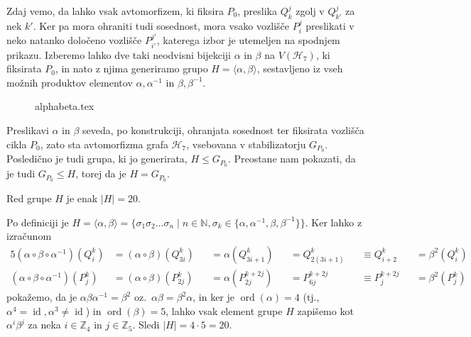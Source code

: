 \documentclass[fin1, tisk]{fmfdelo}
\newcommand{\hof}{\mathscr{H}_{7}}
\newcommand{\ord}{\operatorname{ord}}
\newcommand{\id}{\operatorname{id}}
\begin{document}
Zdaj vemo, da lahko vsak avtomorfizem, ki fiksira $P_0$, preslika $Q_k^j$ zgolj v $Q_{k'}^{j}$ za nek $k'$.
Ker pa mora ohraniti tudi sosednost, mora vsako vozlišče $P_i^j$ preslikati v neko natanko določeno vozlišče $P_{i'}^{j'}$, 
katerega izbor je utemeljen na spodnjem prikazu.
Izberemo lahko dve taki neodvisni bijekciji $\alpha$ in $\beta$ na $V(\hof)$, 
ki fiksirata $P_0$, in nato z njima generiramo grupo
$H = \langle\alpha,\beta\rangle$, sestavljeno iz vseh možnih produktov elementov $\alpha, \alpha^{-1}$ in $\beta, \beta^{-1}$.
 
\begin{figure}[h]
    {alphabeta.tex}
\end{figure}

\begin{opomba}
    Preslikavi $\alpha$ in $\beta$ seveda, po konstrukciji, ohranjata sosednost ter fiksirata vozlišča cikla $P_0$,
    zato sta avtomorfizma grafa $\hof$, vsebovana v stabilizatorju $G_{P_0}$.
    Posledično je tudi grupa, ki jo generirata, $H \leq G_{P_0}$. Preostane nam pokazati,
    da je tudi $G_{P_0} \leq H$, torej da je $H = G_{P_0}$.
\end{opomba}

\begin{lema}\label{le:red_grupe_pi}
    Red grupe $H$ je enak $|H| = 20$.
\end{lema}
\begin{dokaz}
    Po definiciji je 
    $H = \langle \alpha, \beta \rangle= \{\sigma_1\sigma_2\ldots \sigma_n\mid n\in\mathbb{N}, \sigma_k\in \{\alpha, \alpha^{-1}, \beta, \beta^{-1}\}\}$.
    Ker lahko z izračunom 
    \begin{alignat*}{5}
    (\alpha\circ\beta\circ\alpha^{-1})(Q_i^k) &= 
    (\alpha\circ\beta)(Q_{3i}^k) &&= 
    \alpha(Q_{3i+1}^k) &&= Q_{2(3i+1)}^{k}
    &&\equiv Q_{i+2}^k &&= \beta^2(Q_i^k)\\
    (\alpha\circ\beta\circ\alpha^{-1})(P_j^k) &=
    (\alpha\circ\beta)(P_{2j}^k) &&= 
    \alpha(P_{2j}^{k+2j}) &&= P_{6j}^{k+2j}
    &&\equiv P_j^{k+2j} &&= \beta^2(P_j^k)
    \end{alignat*}
    pokažemo, da je $\alpha\beta\alpha^{-1} = \beta^2$ oz.~$\alpha\beta = \beta^2\alpha$, 
    in ker je $\ord(\alpha) = 4$ (tj., $\alpha^4 = \id, \alpha^3 \neq \id$) in $\ord(\beta) = 5$,
    lahko vsak element grupe $H$ zapišemo kot $\alpha^i\beta^j$ za neka $i\in\mathbb{Z}_4$ in $j\in\mathbb{Z}_5$.
    Sledi $|H| = 4\cdot 5 = 20$.
\end{dokaz}
\end{document}
